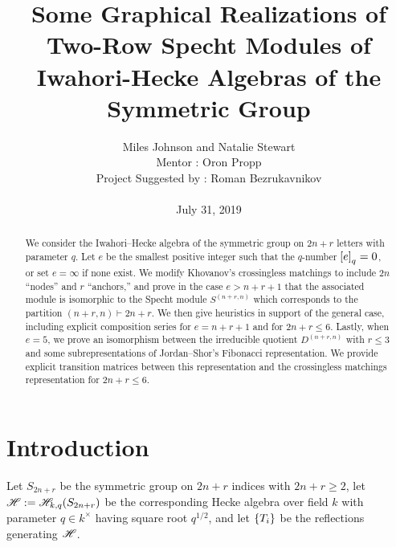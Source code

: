 \documentclass{amsart}
\begin{document}
  \title[Some Graphical Realizations of Two-Row Specht Modules of Hecke Algebras]{Some Graphical Realizations of Two-Row Specht Modules of Iwahori-Hecke Algebras of the Symmetric Group}
  \author[Miles Johnson and Natalie Stewart]{Miles Johnson and Natalie Stewart\\
    Mentor : Oron Propp\\
  Project Suggested by : Roman Bezrukavnikov\\ \; \\
  July 31, 2019
  }

   \begin{titlepage}
    \maketitle
    \begin{abstract}
      We consider the Iwahori--Hecke algebra of the symmetric group on $2n + r$ letters with parameter $q$.
      Let $e$ be the smallest positive integer such that the $q$-number $\left[ e \right]_q = 0$, or set $e = \infty$ if none exist.
      We modify Khovanov's crossingless matchings to include $2n$ ``nodes'' and $r$ ``anchors,'' and prove in the case $e > n + r + 1$ that the associated module is isomorphic to the Specht module $S^{(n+r,n)}$ which corresponds to the partition $(n + r,n) \vdash 2n + r$.
      We then give heuristics in support of the general case, including explicit composition series for $e = n + r + 1$ and for $2n + r \leq 6$. 
      Lastly, when $e = 5$, we prove an isomorphism between the irreducible quotient $D^{(n+r,n)}$ with $r \leq 3$ and some subrepresentations of Jordan--Shor's Fibonacci representation.
      We provide explicit transition matrices between this representation and the crossingless matchings representation for $2n + r \leq 6$.
    \end{abstract}

  \begingroup
  \hypersetup{linkcolor=black} %
  \tableofcontents
  \endgroup

  \end{titlepage}

\section{Introduction} 
  Let $S_{2n+r}$ be the symmetric group on $2n+r$ indices with $2n + r \geq 2$, let $\mathscr{H} := \mathscr{H}_{k,q}(S_{2n+r})$ be the corresponding Hecke algebra over field $k$ with parameter $q \in k^\times$ having square root $q^{1/2}$, and let $\left\{ T_i \right\}$ be the reflections generating $\mathscr{H}$.
  
\end{document}
